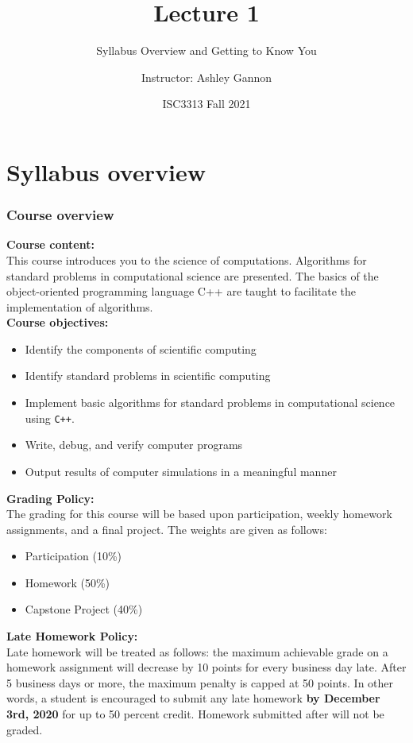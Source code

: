 \documentclass{if-beamer}
\title[Lecture 1]{Lecture 1}
\subtitle{Syllabus Overview and Getting to Know You}
\author{Instructor: Ashley Gannon}
\date{ISC3313 Fall 2021}
\begin{document}
\begin{frame}
  \titlepage
\end{frame}

\section{Syllabus overview}

\begin{frame}
\frametitle{Course overview}
{\textbf{Course content:}} \\
{This course introduces you to the science of computations. Algorithms
	for standard problems in computational science are presented. The
	basics of the object-oriented programming language C++ are taught to
	facilitate the implementation of algorithms.} \\[0.2cm]
{\textbf{Course objectives:}} \\
\begin{itemize}
	\item Identify the components of scientific computing
	\item Identify standard problems in scientific computing
	\item Implement basic algorithms for standard problems in computational science using \texttt{C++}.
	\item Write, debug, and verify computer programs
	\item Output results of computer simulations in a meaningful manner
\end{itemize}
\end{frame}


\begin{frame}
\textbf{Grading Policy:} \\[0.1cm]
The grading for this course will be based upon participation, weekly homework assignments, and a final project. The weights are given as follows:
\begin{itemize}
	\item Participation (10\%)
	\item Homework (50\%)
	\item Capstone Project (40\%)
\end{itemize}
\vspace{.25cm}
\textbf{Late Homework Policy:}\\
Late homework will be treated as follows: the maximum achievable grade on a homework assignment will decrease by 10 points for every business day late. After 5 business days or more, the maximum penalty is capped at 50 points. In other words, a student is encouraged to submit any late homework \textbf{by December 3rd, 2020} for up to 50 percent credit. Homework submitted after will not be graded.
\end{frame}
\end{document}
